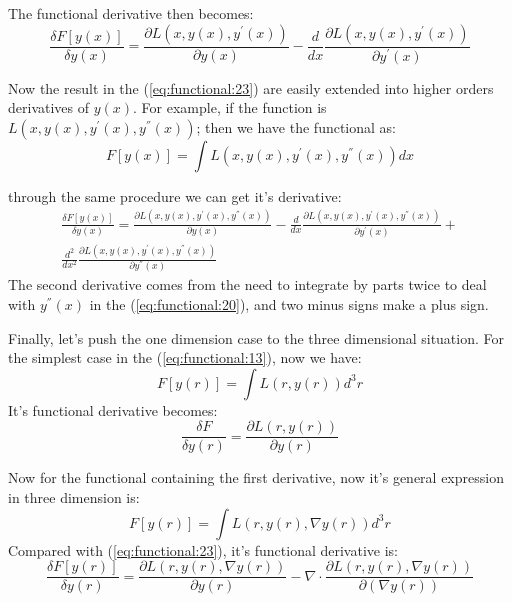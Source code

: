 The functional derivative then becomes:
\begin{equation}
  \label{eq:functional:23}
  \frac{\delta F[y(x)]}{\delta y(x)} = 
  \frac{\partial L(x, y(x), y^{'}(x))} {\partial y(x)} -
  \frac{d}{dx} \frac{\partial L(x, y(x), y^{'}(x))}
  {\partial y^{'}(x)}
\end{equation}

Now the result in the (\ref{eq:functional:23}) are easily extended
into higher orders derivatives of $y(x)$. For example, if the function
is $L(x, y(x), y^{'}(x), y^{''}(x))$; then we have the functional as:
\begin{equation}
  \label{eq:functional:25}
  F[y(x)] = \int L(x, y(x), y^{'}(x), y^{''}(x)) dx
\end{equation}

through the same procedure we can get it's derivative:
\begin{multline}
  \label{eq:functional:24}
  \frac{\delta F[ y(x)]}{\delta y(x)} = \frac{\partial L(x, y(x),
    y^{'}(x), y^{''}(x))} {\partial y(x)} - \frac{d}{dx}
  \frac{\partial L(x, y(x), y^{'}(x), y^{''}(x))}
  {\partial y^{'}(x)} + \\
  \frac{d^{2}}{dx^{2}} \frac{\partial L(x, y(x), y^{'}(x), y^{''}(x))}
  {\partial y^{''}(x)}
\end{multline}
The second derivative comes from the need to integrate by parts twice
to deal with $y^{''}(x)$ in the (\ref{eq:functional:20}), and two
minus signs make a plus sign.

Finally, let's push the one dimension case to the three dimensional
situation. For the simplest case in the (\ref{eq:functional:13}), now
we have:
\begin{equation}
  \label{eq:functional:26}
  F[y(r)] = \int L(r, y(r)) d^{3}r
\end{equation}
It's functional derivative becomes:
\begin{equation}
  \label{eq:functional:27}
  \frac{\delta F}{\delta y(r)} =  \frac{\partial
    L(r, y(r))}{\partial y(r)} 
\end{equation}

Now for the functional containing the first derivative, now it's
general expression in three dimension is:
\begin{equation}
  \label{eq:functional:28}
  F[y(r)] = \int L(r, y(r), \nabla y(r)) d^{3}r
\end{equation}
Compared with (\ref{eq:functional:23}), it's functional derivative is:
\begin{equation}
  \label{eq:functional:29}
  \frac{\delta  F[y(r)]}{\delta y(r)} = 
  \frac{\partial L(r, y(r), \nabla y(r))} {\partial y(r)} -
  \nabla \cdot \frac{\partial L(r, y(r), \nabla y(r))}
  {\partial (\nabla y(r))}
\end{equation}

